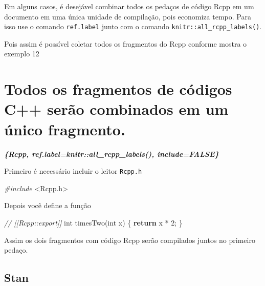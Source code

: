 \documentclass[
]{book}
\newenvironment{Shaded}{\begin{snugshade}}{\end{snugshade}}
\newcommand{\CommentTok}[1]{\textcolor[rgb]{0.56,0.35,0.01}{\textit{#1}}}
\newcommand{\ControlFlowTok}[1]{\textcolor[rgb]{0.13,0.29,0.53}{\textbf{#1}}}
\newcommand{\DataTypeTok}[1]{\textcolor[rgb]{0.13,0.29,0.53}{#1}}
\newcommand{\DecValTok}[1]{\textcolor[rgb]{0.00,0.00,0.81}{#1}}
\newcommand{\ImportTok}[1]{#1}
\newcommand{\InformationTok}[1]{\textcolor[rgb]{0.56,0.35,0.01}{\textbf{\textit{#1}}}}
\newcommand{\NormalTok}[1]{#1}
\newcommand{\PreprocessorTok}[1]{\textcolor[rgb]{0.56,0.35,0.01}{\textit{#1}}}
\begin{document}
Em alguns casos, é desejável combinar todos os pedaços de código Rcpp em um documento em uma única unidade de compilação, pois economiza tempo. Para isso use o comando \texttt{ref.label} junto com o comando \texttt{knitr::all\_rcpp\_labels()}.

Pois assim é possível coletar todos os fragmentos do Rcpp conforme mostra o exemplo 12

\hypertarget{todos-os-fragmentos-de-cuxf3digos-c-seruxe3o-combinados-em-um-uxfanico-fragmento.}{%
\section{Todos os fragmentos de códigos C++ serão combinados em um único fragmento.}\label{todos-os-fragmentos-de-cuxf3digos-c-seruxe3o-combinados-em-um-uxfanico-fragmento.}}

\begin{Shaded}
\begin{Highlighting}[]
 \InformationTok{\textasciigrave{}\textasciigrave{}\textasciigrave{}\{Rcpp, ref.label=knitr::all\_rcpp\_labels(), include=FALSE\}}
\InformationTok{\textasciigrave{}\textasciigrave{}\textasciigrave{}}
\end{Highlighting}
\end{Shaded}

Primeiro é necessário incluir o leitor \texttt{Rcpp.h}

\begin{Shaded}
\begin{Highlighting}[]
\PreprocessorTok{\#include }\ImportTok{\textless{}Rcpp.h\textgreater{}}
\end{Highlighting}
\end{Shaded}

Depois você define a função

\begin{Shaded}
\begin{Highlighting}[]
\CommentTok{// [[Rcpp::export]]}
\DataTypeTok{int}\NormalTok{ timesTwo(}\DataTypeTok{int}\NormalTok{ x) \{}
\ControlFlowTok{return}\NormalTok{ x * }\DecValTok{2}\NormalTok{;}
\NormalTok{\}}
\end{Highlighting}
\end{Shaded}

Assim os dois fragmentos com código Rcpp serão compilados juntos no primeiro pedaço.

\hypertarget{stan}{%
\subsection{Stan}\label{stan}}
\end{document}
